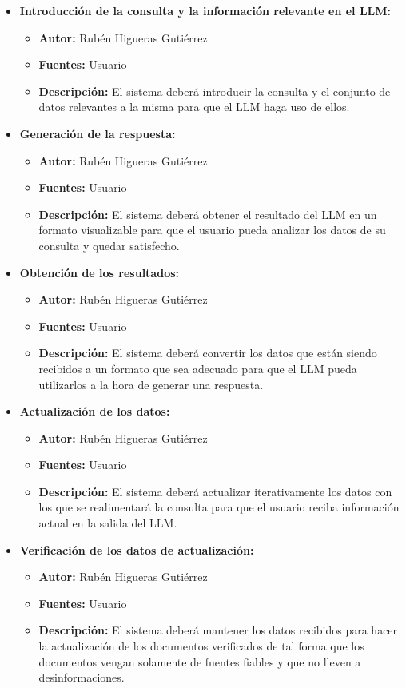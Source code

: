 \begin{itemize}
\begin{itemize}
    \end{itemize}
    \item \textbf{Introducción de la consulta y la información relevante en el LLM:}
    \begin{itemize}
        \item \textbf{Autor:} Rubén Higueras Gutiérrez
        \item \textbf{Fuentes:} Usuario
        \item \textbf{Descripción:} El sistema deberá introducir la consulta y el conjunto de datos relevantes a la misma para que el LLM haga uso de ellos.
    \end{itemize}
    \item \textbf{Generación de la respuesta:}
    \begin{itemize}
        \item \textbf{Autor:} Rubén Higueras Gutiérrez
        \item \textbf{Fuentes:} Usuario
        \item \textbf{Descripción:} El sistema deberá obtener el resultado del LLM en un formato visualizable para que el usuario pueda analizar los datos de su consulta y quedar satisfecho.
    \end{itemize}
    \item \textbf{Obtención de los resultados:}
    \begin{itemize}
        \item \textbf{Autor:} Rubén Higueras Gutiérrez
        \item \textbf{Fuentes:} Usuario
        \item \textbf{Descripción:} El sistema deberá convertir los datos que están siendo recibidos a un formato que sea adecuado para que el LLM pueda utilizarlos a la hora de generar una respuesta.
    \end{itemize}
    \item \textbf{Actualización de los datos:}
    \begin{itemize}
        \item \textbf{Autor:} Rubén Higueras Gutiérrez
        \item \textbf{Fuentes:} Usuario
        \item \textbf{Descripción:} El sistema deberá actualizar iterativamente los datos con los que se realimentará la consulta para que el usuario reciba información actual en la salida del LLM.
    \end{itemize}
    \item \textbf{Verificación de los datos de actualización:}
    \begin{itemize}
        \item \textbf{Autor:} Rubén Higueras Gutiérrez
        \item \textbf{Fuentes:} Usuario
        \item \textbf{Descripción:} El sistema deberá mantener los datos recibidos para hacer la actualización de los documentos verificados de tal forma que los documentos vengan solamente de fuentes fiables y que no lleven a desinformaciones.
    \end{itemize}
\end{itemize}

